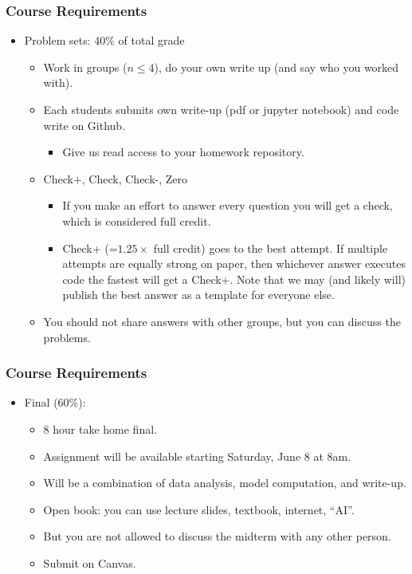 \documentclass[english,xcolor=svgnames]{beamer}
\begin{document}
\begin{frame}
\frametitle{Course Requirements}
\begin{itemize}
	\item Problem sets: 40\% of total grade
	\begin{itemize}
		\item Work in groups ($n\le 4$), do your own write up (and say who you worked with).
		\item Each students submits own write-up (pdf or jupyter notebook) and code write on Github.
		\begin{itemize}
			\item Give us read access to your homework repository.
		\end{itemize}
		\item Check+, Check, Check-, Zero
		\begin{itemize}
			\item If you make an effort to answer every question you will get a check, which is considered full credit.
			\item Check+ (=$1.25\times$ full credit) goes to the best attempt. If multiple attempts are equally strong on paper, then whichever answer executes code the fastest will get a Check+. Note that we may (and likely will) publish the best answer as a template for everyone else.
		\end{itemize}
		\item You should not share answers with other groups, but you can discuss the problems.
	\end{itemize}
\end{itemize}
\end{frame}

\begin{frame}
\frametitle{Course Requirements}
\begin{itemize}
	\item Final (60\%):
	\begin{itemize}
		\item 8 hour take home final.
		\item Assignment will be available starting Saturday, June 8 at 8am.
		\item Will be a combination of data analysis, model computation, and write-up.
		\item Open book: you can use lecture slides, textbook, internet, ``AI''.
		\item But you are not allowed to discuss the midterm with any other person.
		\item Submit on Canvas.
	\end{itemize}
\end{itemize}
\end{frame}
\end{document}
